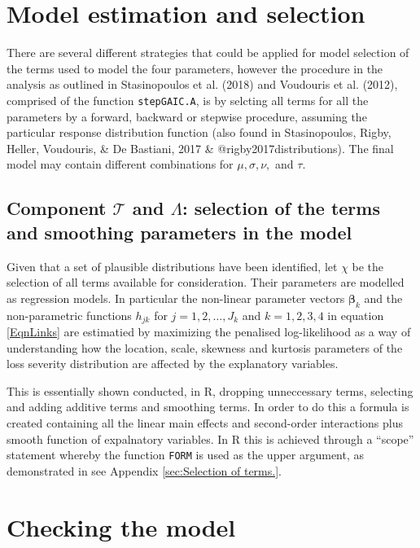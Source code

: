 \documentclass{DissertateUSU}
\begin{document}
\section{Model estimation and selection}
\label{sec:Model estimation and selection}

There are several different strategies that could be applied for model
selection of the terms used to model the four parameters, however the
procedure in the analysis as outlined in Stasinopoulos et al. (2018) and
Voudouris et al. (2012), comprised of the function \texttt{stepGAIC.A},
is by selcting all terms for all the parameters by a forward, backward
or stepwise procedure, assuming the particular response distribution
function (also found in Stasinopoulos, Rigby, Heller, Voudouris, \& De
Bastiani, 2017 \& @rigby2017distributions). The final model may contain
different combinations for \(\mu, \sigma,\nu,\) and \(\tau\).

\subsection{Component $\mathcal{T}$ and $\Lambda$: selection of the terms and smoothing parameters in the model}

Given that a set of plausible distributions have been identified, let
\(\chi\) be the selection of all terms available for consideration.
Their parameters are modelled as regression models. In particular the
non-linear parameter vectors \(\mathbf{\beta}_k\) and the non-parametric
functions \(h_{jk}\) for \(j=1,2,\ldots,J_k\) and \(k=1,2,3,4\) in
equation \ref{EqnLinks} are estimatied by maximizing the penalised
log-likelihood as a way of understanding how the location, scale,
skewness and kurtosis parameters of the loss severity distribution are
affected by the explanatory variables.\medskip

This is essentially shown conducted, in R, dropping unneccessary terms,
selecting and adding additive terms and smoothing terms. In order to do
this a formula is created containing all the linear main effects and
second-order interactions plus smooth function of expalnatory variables.
In R this is achieved through a ``scope'' statement whereby the function
\texttt{FORM} is used as the upper argument, as demonstrated in see
Appendix \ref{sec:Selection of terms.}.

\singlespacing

\doublespacing

\section{Checking the model}
\end{document}
